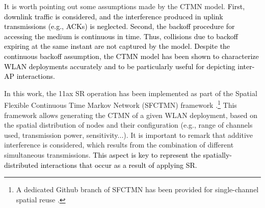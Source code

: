 \documentclass{ieeeaccess}
\begin{document}
It is worth pointing out some assumptions made by the CTMN model. \textcolor{black}{First, downlink traffic is considered, and the interference produced in uplink transmissions (e.g., ACKs) is neglected. Second, the backoff procedure for accessing the medium is continuous in time. Thus, collisions due to backoff expiring at the same instant are not captured by the model. Despite the continuous backoff assumption, the CTMN model has been shown to characterize WLAN deployments accurately \cite{bellalta2016throughput,michaloliakos2016performance} and to be particularly useful for depicting inter-AP interactions.}



In this work, the 11ax SR operation has been implemented as part of the Spatial Flexible Continuous Time Markov Network (SFCTMN) framework \cite{barrachina2019dynamic, barrachina2019overlap, wilhelmi2019potential}.\footnote{A dedicated Github branch of SFCTMN has been provided for single-channel spatial reuse \cite{wilhelmi2019sfctm_spatial_reuse}.} This framework allows generating the CTMN of a given WLAN deployment, based on the spatial distribution of nodes and their configuration (e.g., range of channels used, transmission power, sensitivity...). It is important to remark that additive interference is considered, which results from the combination of different simultaneous transmissions. \textcolor{black}{This aspect is key to represent the spatially-distributed interactions that occur as a result of applying SR.}
\end{document}
